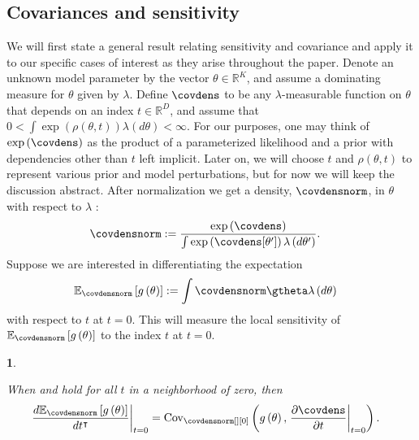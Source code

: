 \documentclass{article}\usepackage[]{graphicx}\usepackage[]{color}
\theoremstyle{plain}
\newtheorem{thm}{\protect\theoremname}[section]
\theoremstyle{definition}
\theoremstyle{plain}
\theoremstyle{plain}
\theoremstyle{plain}
\theoremstyle{plain}
\providecommand{\theoremname}{Theorem}
\begin{document}
\subsection{Covariances and sensitivity\label{subsec:cov_and_sens}}

We will first state a general result relating sensitivity and covariance
and apply it to our specific cases of interest as they arise throughout
the paper. Denote an unknown model parameter by the vector $\theta\in\mathbb{R}^{K}$,
and assume a dominating measure for $\theta$ given by $\lambda$.
Define $\covdens$ to be any $\lambda$-measurable function on $\theta$
that depends on an index $t\in\mathbb{R}^{D}$, and assume that $0<\int\exp\left(\rho\left(\theta,t\right)\right)\lambda\left(d\theta\right)<\infty$.
For our purposes, one may think of $\exp\left(\covdens\right)$ as
the product of a parameterized likelihood and a prior with dependencies
other than $t$ left implicit. Later on, we will choose $t$ and $\rho\left(\theta,t\right)$
to represent various prior and model perturbations, but for now we
will keep the discussion abstract. After normalization we get a density,
$\covdensnorm$, in $\theta$ with respect to $\lambda$ : 
\begin{align*}
\covdensnorm & :=\frac{\exp\left(\covdens\right)}{\int\exp\left(\covdens[\theta']\right)\lambda\left(d\theta'\right)}.
\end{align*}
 Suppose we are interested in differentiating the expectation
\begin{align*}
\mbe_{\covdensnorm}\left[g\left(\theta\right)\right] & :=\int\covdensnorm\gtheta\lambda\left(d\theta\right)
\end{align*}
with respect to $t$ at $t=0$. This will measure the local sensitivity
of $\mbe_{\covdensnorm}\left[g\left(\theta\right)\right]$ to the
index $t$ at $t=0$.
\begin{thm}
\label{thm:sens_cov}

When  and 
hold for all $t$ in a neighborhood of zero, then
\begin{align}
\left.\frac{d\mbe_{\covdensnorm}\left[g\left(\theta\right)\right]}{dt^{\trans}}\right|_{t=0} & =\cov_{\covdensnorm[][0]}\left(g\left(\theta\right),\left.\frac{\partial\covdens}{\partial t}\right|_{t=0}\right).\label{eq:covariance_sensitivity_general}
\end{align}
\end{thm}
\end{document}
